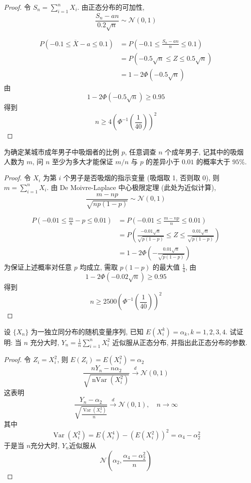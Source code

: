 \documentclass[../main.tex]{subfiles}
\begin{document}
\begin{proof}
令 $S_{n}= \sum _{i= 1}^{n}X_{i}$. 由正态分布的可加性,
 $$ \frac{S_{n}-an }{0.2\sqrt{n} }\sim   \mathcal{N}\left(0,1\right) $$

 $$ \begin{aligned} P\left(-0.1\le \overline{X}-a\le 0.1\right)&=P\left(-0.1\le \frac{S_{n}-an }{n }\le 0.1\right)\\& =  P\left(-0.5\sqrt{n}\le Z\le 0.5\sqrt{n}\right)\\&= 1-2\Phi \left(-0.5\sqrt{n}\right)\end{aligned} $$
由
 $$1- 2\Phi \left(-0.5\sqrt{n}\right)\ge 0.95 $$
得到
 $$ n\ge  4 \left(\Phi ^{-1} \left(\frac{1 }{40 }\right)\right)^{2} $$
\end{proof}
\begin{exercise}{}{}
为确定某城市成年男子中吸烟者的比例 $p$, 任意调查 $n$ 个成年男子, 记其中的吸烟人数为 $m$, 问 $n$ 至少为多大才能保证 $m/n$ 与 $p$ 的差异小于 $0.01$ 的概率大于 $95\%$.
\end{exercise}
\begin{proof}
令 $X_i$ 为第 $i$ 个男子是否吸烟的指示变量 (吸烟取 1, 否则取 0), 则 $m = \sum_{i=1}^n X_i$. 由 De Moivre-Laplace 中心极限定理 (此处为近似计算),
 $$ \frac{m-np}{\sqrt{np(1-p)}} \sim \mathcal{N}(0,1) $$

 $$ \begin{aligned} P\left( -0.01 \le \frac{m}{n} - p \le 0.01 \right) &= P\left( -0.01 \le \frac{m-np}{n} \le 0.01 \right) \\ &= P\left( \frac{-0.01\sqrt{n}}{\sqrt{p(1-p)}} \le Z \le \frac{0.01\sqrt{n}}{\sqrt{p(1-p)}} \right) \\ &= 1 - 2\Phi\left( -\frac{0.01\sqrt{n}}{\sqrt{p(1-p)}} \right) \end{aligned} $$
为保证上述概率对任意 $p$ 均成立, 需取 $p(1-p)$ 的最大值 $\frac{1}{4}$, 由
 $$ 1 - 2\Phi\left( -0.02\sqrt{n} \right) \ge 0.95 $$
得到
 $$ n \ge 2500 \left( \Phi^{-1}\left( \frac{1}{40} \right) \right)^2 $$
\end{proof}
\begin{exercise}{}{}
设 $\{X_n\}$ 为一独立同分布的随机变量序列, 已知 $E(X_i^k)=\alpha_k, k=1,2,3,4$. 试证明: 当 $n$ 充分大时, $Y_n=\frac{1}{n}\sum_{i=1}^n X_i^2$ 近似服从正态分布, 并指出此正态分布的参数.
\end{exercise}
\begin{proof}
令 $Z_{i}= X_{i}^{2}$, 则 $E\left(Z_{i}\right)= E\left(X_{i}^{2}\right)=\alpha _{2}$
 $$ \frac{nY_{n}-n\alpha _2  }{\sqrt{\operatorname{nVar}\left(X_{i}^{2}\right)} }\xrightarrow{d} \mathcal{N}\left(0,1\right)  $$
这表明
 $$ \frac{Y_{n}-\alpha _2  }{\sqrt{\frac{\operatorname{Var}\left(X_{i}^{2}\right) }{n }} }\xrightarrow{d}  \mathcal{N}\left(0,1\right) ,\quad n\to \infty  $$
其中
 $$ \operatorname{Var}\left(X_{i}^{2}\right)= E\left(X_{i}^{4}\right)-\left(E\left(X_{i}^{2}\right)\right)^{2}= \alpha _4 -\alpha _2 ^{2} $$
于是当 $n$充分大时, $Y_{n}$近似服从
 $$ \mathcal{N}\left(\alpha _2 , \frac{\alpha_4-\alpha _2 ^{2}}{ n}\right) $$
\end{proof}
\end{document}
